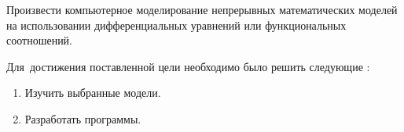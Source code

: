 
{\actuality} 

{\aim} Произвести компьютерное моделирование непрерывных математических моделей на использовании дифференциальных уравнений или функциональных соотношений.

Для~достижения поставленной цели необходимо было решить следующие {\tasks}:
\begin{enumerate}
  \item Изучить выбранные модели.
  \item Разработать программы.
\end{enumerate}
    

